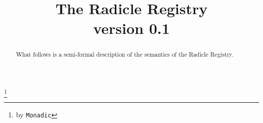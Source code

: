 \documentclass[a4paper, oneside, 11pt, final]{amsart}
\begin{document}
\title[Radicle Registry]{The Radicle Registry \\ {\tiny version 0.1}}
\thanks{by \texttt{Monadic}}

\begin{abstract}
What follows is a semi-formal description of the semantics of the Radicle Registry.
\end{abstract}

\maketitle

\bigskip
\tableofcontents
\newpage


\end{document}

